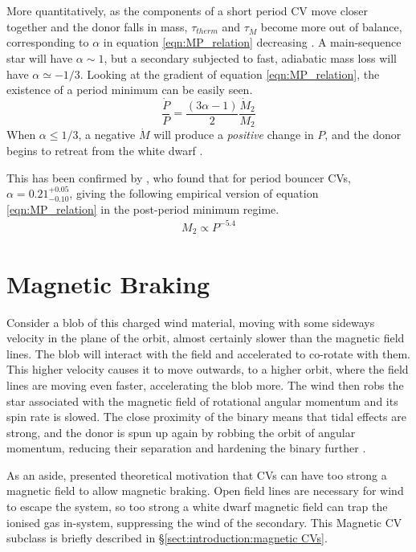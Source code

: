 More quantitatively, as the components of a short period CV move closer together and the donor falls in mass, $\tau_{therm}$ and $\tau_{\dot M}$ become more out of balance, corresponding to $\alpha$ in equation \ref{eqn:MP_relation} decreasing \citep{Knigge2011b}. A main-sequence star will have $\alpha \sim 1$, but a secondary subjected to fast, adiabatic mass loss will have $\alpha \simeq -1/3$. Looking at the gradient of equation \ref{eqn:MP_relation}, the existence of a period minimum can be easily seen.
\begin{equation}
    \frac{\dot P}{P} = \frac{(3\alpha - 1)}{2} \frac{\dot M_2}{M_2}
\end{equation}
When $\alpha \le 1/3$, a negative $\dot M$ will produce a \textit{positive} change in $P$, and the donor begins to retreat from the white dwarf \citep{rezzolla2001}. 

This has been confirmed by \citet{knigge11}, who found that for period bouncer CVs, $\alpha = 0.21^{+0.05}_{-0.10}$, giving the following empirical version of equation \ref{eqn:MP_relation} in the post-period minimum regime.
\begin{align}
    M_2 \propto P^{-5.4}
\end{align}


\section{Magnetic Braking}
\label{sect:introduction:magnetic braking}


Consider a blob of this charged wind material, moving with some sideways velocity in the plane of the orbit, almost certainly slower than the magnetic field lines. 
The blob will interact with the field and accelerated to co-rotate with them.
This higher velocity causes it to move outwards, to a higher orbit, where the field lines are moving even faster, accelerating the blob more. 
The wind then robs the star associated with the magnetic field of rotational angular momentum and its spin rate is slowed. The close proximity of the binary means that tidal effects are strong, and the donor is spun up again by robbing the orbit of angular momentum, reducing their separation and hardening the binary further \citep{verbunt1981}.

As an aside, \citet{wickramasinghe1996} presented theoretical motivation that CVs can have too strong a magnetic field to allow magnetic braking. Open field lines are necessary for wind to escape the system, so too strong a white dwarf magnetic field can trap the ionised gas in-system, suppressing the wind of the secondary. This Magnetic CV subclass is briefly described in \S\ref{sect:introduction:magnetic CVs}.

